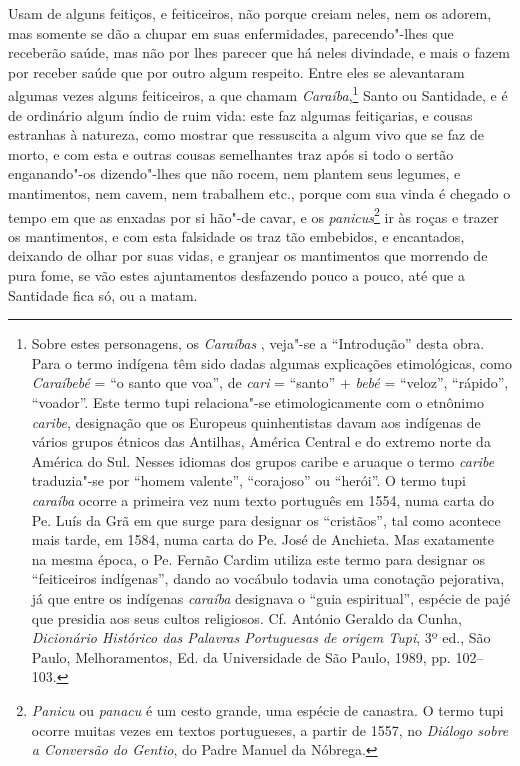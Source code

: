 \begin{linenumbers}
 Usam de alguns feitiços, e feiticeiros, não porque creiam neles, nem os
adorem, mas somente se dão a chupar em suas enfermidades,
parecendo"-lhes que receberão saúde, mas não por lhes parecer que há
neles divindade, e mais o fazem por receber saúde que por outro algum
respeito. Entre eles se alevantaram algumas vezes alguns feiticeiros, a
que chamam \textit{Caraíba},\footnote{ Sobre estes personagens, os
\textit{Caraíbas }, veja"-se a ``Introdução'' desta obra. Para o termo
indígena têm sido dadas algumas explicações etimológicas, como
\textit{Caraíbebé} = ``o santo que voa'', de \textit{cari} = ``santo'' +
\textit{bebé} = ``veloz'', ``rápido'', ``voador''. Este termo tupi
relaciona"-se etimologicamente com o etnônimo \textit{caribe},
designação que os Europeus quinhentistas davam aos indígenas de vários
grupos étnicos das Antilhas, América Central e do extremo norte da
América do Sul. Nesses idiomas dos grupos caribe e aruaque o termo
\textit{caribe} traduzia"-se por ``homem valente'', ``corajoso'' ou ``herói''.
O termo tupi \textit{caraíba} ocorre a primeira vez num texto português
em 1554, numa carta do Pe. Luís da Grã em que surge
para designar os ``cristãos'', tal como acontece mais tarde, em 1584, 
numa carta do Pe. José de Anchieta. Mas exatamente na mesma
época, o Pe. Fernão Cardim utiliza este termo para designar os
``feiticeiros indígenas'', dando ao vocábulo todavia uma conotação
pejorativa, já que entre os indígenas \textit{caraíba} designava o
``guia espiritual'', espécie de pajé que presidia aos seus cultos
religiosos. Cf. António Geraldo da Cunha, \textit{Dicionário Histórico
das Palavras Portuguesas de origem Tupi}, 3º ed., São Paulo,
Melhoramentos, Ed. da Universidade de São Paulo, 1989, pp. 102--103.} 
Santo ou Santidade, e é de ordinário algum índio de ruim vida: este faz 
algumas feitiçarias, e cousas estranhas à natureza, como mostrar que 
ressuscita a algum vivo que se faz de morto, e com esta e outras cousas semelhantes traz após si todo
o sertão enganando"-os dizendo"-lhes que não rocem, nem plantem seus
legumes, e mantimentos, nem cavem, nem trabalhem etc., porque com sua
vinda é chegado o tempo em que as enxadas por si hão"-de cavar, e os
\textit{panicus}\footnote{ \textit{Panicu} ou \textit{panacu} é um
cesto grande, uma espécie de canastra. O termo tupi ocorre muitas vezes
em textos portugueses, a partir de 1557, no \textit{Diálogo sobre a
Conversão do Gentio}, do Padre Manuel da Nóbrega.} ir às roças
e trazer os mantimentos, e com esta falsidade os traz tão embebidos, e
encantados, deixando de olhar por suas vidas, e granjear os mantimentos
que morrendo de pura fome, se vão estes ajuntamentos desfazendo pouco a
pouco, até que a Santidade fica só, ou a matam.


\end{linenumbers}
